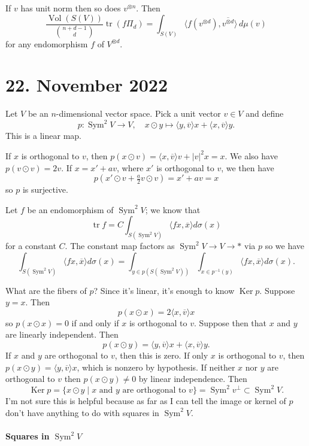 \documentclass[11pt]{amsart}
\theoremstyle{definition}
\def\ov#1{\overline{#1}}
\DeclareMathOperator{\Vol}{Vol}
\DeclareMathOperator{\Ker}{Ker}
\DeclareMathOperator{\Sym}{Sym}
\DeclareMathOperator{\tr}{tr}
\begin{document}
If $v$ has unit norm then so does $v^{\otimes n}$.
Then
$$
\frac{\Vol(S(V))}{\binom{n+d-1}{d}} \tr(f \Pi_d)
= \int_{S(V)} \langle f(v^{\otimes d}), \ov{v^{\otimes d}} \rangle \, d\mu(v)
$$
for any endomorphism $f$ of $V^{\otimes d}$.


\section{22. November 2022}

Let $V$ be an $n$-dimensional vector space.
Pick a unit vector $v \in V$ and define
$$
p : \Sym^2 V \to V,
\quad
x \odot y \mapsto \langle y, \ov v \rangle x + \langle x, \ov v \rangle y.
$$
This is a linear map.

If $x$ is orthogonal to $v$, then
$p(x \odot v) = \langle x, \ov v \rangle v + |v|^2 x = x$.
We also have $p(v \odot v) = 2 v$.
If $x = x' + a v$, where $x'$ is orthogonal to $v$, we then have
$$
p(x' \odot v + \tfrac a2 v \odot v)
= x' + a v = x
$$
so $p$ is surjective.

Let $f$ be an endomorphism of $\Sym^2 V$; we know that
$$
\tr f = C \int_{S(\Sym^2 V)} \langle f x, \ov x \rangle d\sigma(x)
$$
for a constant $C$.
The constant map factors as $\Sym^2 V \to V \to *$ via $p$
so we have
$$
\int_{S(\Sym^2 V)} \langle f x, \ov x \rangle d\sigma(x)
= \int_{y \in p(S(\Sym^2 V))} \int_{x \in p^{-1}(y)}
\langle f x, \ov{x} \rangle d\sigma(x).
$$

What are the fibers of $p$?
Since it's linear, it's enough to know $\Ker p$.
Suppose $y = x$. Then
$$
p(x \odot x)
= 2 \langle x, \ov v \rangle x
$$
so $p(x \odot x) = 0$ if and only if $x$ is orthogonal to $v$.
Suppose then that $x$ and $y$ are linearly independent.
Then
$$
p(x \odot y) = \langle y, \ov v \rangle x + \langle x, \ov v \rangle y.
$$
If $x$ and $y$ are orthogonal to $v$, then this is zero.
If only $x$ is orthogonal to $v$, then $p(x \odot y) = \langle y, \ov v \rangle
x$, which is nonzero by hypothesis.
If neither $x$ nor $y$ are orthogonal to $v$ then $p(x \odot y) \not= 0$ by
linear independence.
Then
$$
\Ker p
= \{ x \odot y \mid \text{$x$ and $y$ are orthogonal to $v$} \}
= \Sym^2 v^\perp \subset \Sym^2 V.
$$
I'm not sure this is helpful because as far as I can tell the image or kernel
of $p$ don't have anything to do with squares in $\Sym^2 V$.


\paragraph{Squares in $\Sym^2 V$}
\end{document}
